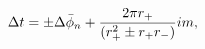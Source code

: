 \begin{equation}
\Delta t = \pm \Delta \bar \phi_n + {2\pi r_+ \over (r_+^2 \pm r_+
r_-)} i m,
\end{equation}

